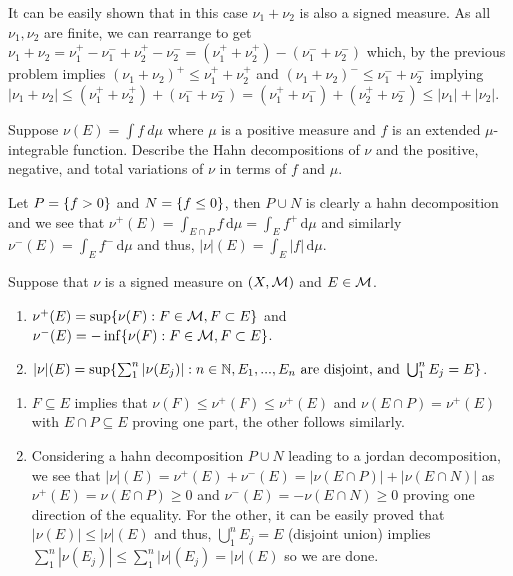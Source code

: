 \documentclass[12pt,a4paper]{article}
\begin{document}
\begin{solution}
It can be easily shown that in this case $\nu_1+\nu_2$ is also a signed measure. 
As all $\nu_1,\nu_2$ are finite, we can rearrange to get $\nu_1+\nu_2=\nu_1^+-\nu_1^-+\nu_2^+-\nu_2^-=(\nu_1^++\nu_2^+)-(\nu_1^-+\nu_2^-)$ which, by the previous problem implies $(\nu_1+\nu_2)^+\leq\nu_1^++\nu_2^+$ and $(\nu_1+\nu_2)^-\leq\nu_1^-+\nu_2^-$ implying $|\nu_1+\nu_2|\leq(\nu_1^++\nu_2^+)+(\nu_1^-+\nu_2^-)=(\nu_1^++\nu_1^-)+(\nu_2^++\nu_2^-)\leq|\nu_1|+|\nu_2|$.
\end{solution}
\begin{problem}\label{prob:3-6}
Suppose $\nu(E)=\int f~d\mu$ where $\mu$ is a positive measure and $f$ is an extended $\mu$-integrable function. Describe the Hahn decompositions of $\nu$ and the positive, negative, and total variations of $\nu$ in terms of $f$ and $\mu$.
\end{problem}
\begin{solution}
	Let $P= \qty{f>0}$ and $N= \qty{f\leq 0}$, then $P\cup N$ is clearly a hahn decomposition and we see that $\nu^+(E)= \int_{E\cap P}^{}f\,\mathrm{d}\mu= \int_{E}^{}f^+\,\mathrm{d}\mu$ and similarly $\nu^-(E)= \int_{E}^{}f^-\,\mathrm{d}\mu$ and thus, $|\nu|(E)= \int_{E}^{}|f|\,\mathrm{d}\mu$.
\end{solution}
\begin{problem}\label{prob:3-7}
Suppose that $\nu$ is a signed measure on $(X, \mathcal{M})$ and $E\in\mathcal{M}$.
\begin{enumerate}[label=\alph*.]
    \item $\nu^{+}(E)=\sup\{\nu(F):F\in\mathcal{M},F\subset E\}$ and $\nu^{-}(E)=-\inf\{\nu(F):F\in\mathcal{M}, F\subset E\}$.
    \item $|\nu|(E)=\sup\{\sum_{1}^{n}|\nu(E_{j})|:n\in\mathbb{N},E_{1},...,E_{n} \text{ are disjoint, and } \bigcup_{1}^{n}E_{j}=E\}$.
\end{enumerate}
\end{problem}
\begin{solution}
\begin{enumerate}[label=\alph*.]
	\item $F \subseteq E$ implies that $\nu(F)\leq\nu^+(F)\leq\nu^+(E)$ and $\nu(E\cap P)=\nu^+(E)$ with $E\cap P \subseteq E$ proving one part, the other follows similarly.
	\item Considering a hahn decomposition $P\cup N$ leading to a jordan decomposition, we see that $|\nu|(E)=\nu^+(E)+\nu^-(E)=|\nu(E\cap P)|+|\nu(E\cap N)|$ as $\nu^+(E)=\nu(E\cap P)\geq 0$ and $\nu^-(E)=-\nu(E\cap N)\geq 0$ proving one direction of the equality. 
	For the other, it can be easily proved that $|\nu(E)|\leq|\nu|(E)$ and thus, $\bigcup_1^nE_j=E$ (disjoint union) implies $\sum_1^n|\nu(E_j)|\leq\sum_1^n|\nu|(E_j)=|\nu|(E)$ so we are done.
\end{enumerate}
\end{solution}
\end{document}
